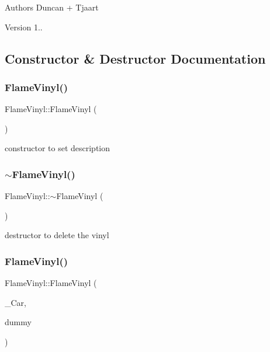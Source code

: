 \begin{DoxyAuthor}{Authors}
Duncan + Tjaart 
\end{DoxyAuthor}
\begin{DoxyVersion}{Version}
1.. 
\end{DoxyVersion}


\subsection{Constructor \& Destructor Documentation}
\mbox{\label{class_flame_vinyl_aa80e3ed232392bcf9358ee7a46360d79}} 
\subsubsection{\texorpdfstring{Flame\+Vinyl()}{FlameVinyl()}\hspace{0.1cm}{\footnotesize\ttfamily [1/2]}}
{\footnotesize\ttfamily Flame\+Vinyl\+::\+Flame\+Vinyl (\begin{DoxyParamCaption}{ }\end{DoxyParamCaption})\hspace{0.3cm}{\ttfamily [inline]}}

constructor to set description \mbox{\label{class_flame_vinyl_ab2a4daa70f1d78eca4166e4192d295e7}} 
\subsubsection{\texorpdfstring{$\sim$\+Flame\+Vinyl()}{~FlameVinyl()}}
{\footnotesize\ttfamily Flame\+Vinyl\+::$\sim$\+Flame\+Vinyl (\begin{DoxyParamCaption}{ }\end{DoxyParamCaption})\hspace{0.3cm}{\ttfamily [inline]}}

destructor to delete the vinyl \mbox{\label{class_flame_vinyl_a045751a742ef319126af22d00b4ec4ea}} 
\subsubsection{\texorpdfstring{Flame\+Vinyl()}{FlameVinyl()}\hspace{0.1cm}{\footnotesize\ttfamily [2/2]}}
{\footnotesize\ttfamily Flame\+Vinyl\+::\+Flame\+Vinyl (\begin{DoxyParamCaption}\item[{\mbox{\hyperlink{class_flame_vinyl}{Flame\+Vinyl}}}]{\+\_\+\+Car,  }\item[{bool}]{dummy }\end{DoxyParamCaption})\hspace{0.3cm}{\ttfamily [inline]}}

